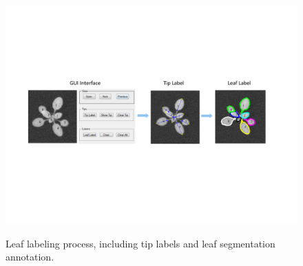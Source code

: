 \begin{figure}
\centering
\includegraphics[width=.98\textwidth]{Figures/labeling}\\
\caption{Leaf labeling process, including tip labels and leaf segmentation annotation.}
\label{fig:label}
\end{figure}

